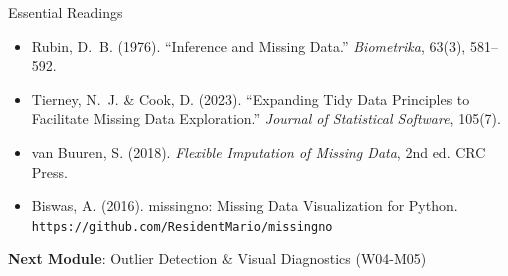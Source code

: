 \documentclass[10pt]{beamer}
\begin{document}
\begin{frame}{Essential Readings}
  \begin{itemize}
    \item Rubin, D.~B. (1976). ``Inference and Missing Data.''
          \emph{Biometrika}, 63(3), 581--592.
    \item Tierney, N.~J. \& Cook, D. (2023). ``Expanding Tidy Data
          Principles to Facilitate Missing Data Exploration.''
          \emph{Journal of Statistical Software}, 105(7).
    \item van Buuren, S. (2018). \emph{Flexible Imputation of Missing
          Data}, 2nd ed. CRC Press.
    \item Biswas, A. (2016). missingno: Missing Data Visualization
          for Python. \texttt{https://github.com/ResidentMario/missingno}
  \end{itemize}
  \vspace{6pt}
  \textbf{Next Module}: Outlier Detection \& Visual Diagnostics (W04-M05)
\end{frame}
\end{document}
